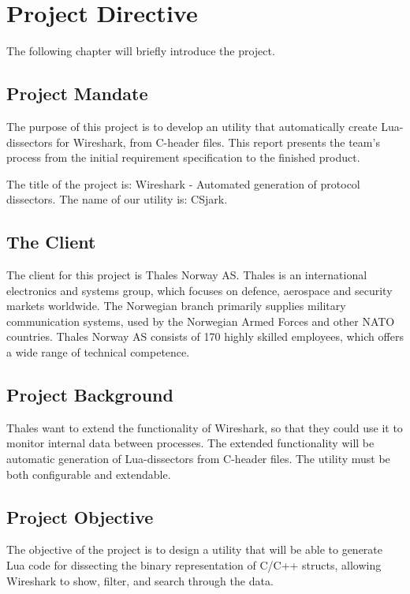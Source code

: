 \chapter{Project Directive}

The following chapter will briefly introduce the project.     

\section{Project Mandate}
The purpose of this project is to develop an utility that automatically create Lua-dissectors for Wireshark, from C-header files. This report presents the team’s process from the initial requirement specification to the finished product. 

The title of the project is: Wireshark - Automated generation of protocol dissectors. The name of our utility is: CSjark.

\section{The Client}
The client for this project is Thales Norway AS. Thales is an international electronics and systems group, which focuses on defence, aerospace and security markets worldwide. The Norwegian branch primarily supplies military communication systems, used by the Norwegian Armed Forces and other NATO countries. Thales Norway AS consists of 170 highly skilled employees, which offers a wide range of technical competence.

\section{Project Background}
Thales want to extend the functionality of Wireshark, so that they could use it to monitor internal data between processes. The extended functionality will be automatic generation of Lua-dissectors from C-header files. The utility must be both configurable and extendable.

\section{Project Objective}
The objective of the project is to design a utility that will be able to generate Lua code for dissecting the binary representation of C/C++ structs, allowing Wireshark to show, filter, and search through the data.

